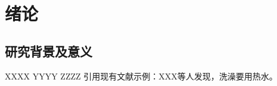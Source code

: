 \chapter{绪论}
\label{chap1}
\section{研究背景及意义}
XXXX YYYY ZZZZ  引用现有文献示例：XXX等人\cite{mittal2022survey}发现，洗澡要用热水。
